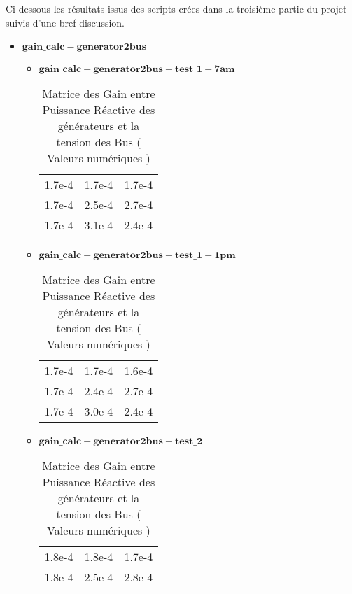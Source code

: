 Ci-dessous les résultats issus des scripts crées dans la troisième partie du projet suivis d'une bref discussion. 

\begin{itemize}
\item $\mathbf{gain\_calc-generator2bus}$\\
\begin{itemize}
	
\item $\mathbf{gain\_calc-generator2bus-test\_1-7am}$
\begin{table}[H]
	\captionsetup{justification=centering,margin=2cm}
	\caption{Matrice des Gain entre Puissance Réactive des générateurs et la tension des Bus ( Valeurs numériques )}
	\centering
	\begin{tabular}{ccc}
		1.7e-4&1.7e-4&1.7e-4\\
		1.7e-4&2.5e-4&2.7e-4\\
		1.7e-4&3.1e-4&2.4e-4\\
	\end{tabular}
\end{table}

\item $\mathbf{gain\_calc-generator2bus-test\_1-1pm}$
\begin{table}[H]
	\captionsetup{justification=centering,margin=2cm}
	\caption{Matrice des Gain entre Puissance Réactive des générateurs et la tension des Bus ( Valeurs numériques )}
	\centering
	\begin{tabular}{ccc}
		1.7e-4&1.7e-4&1.6e-4\\
		1.7e-4&2.4e-4&2.7e-4\\
		1.7e-4&3.0e-4&2.4e-4\\
	\end{tabular}
	
\end{table}
\newpage\vspace{2em}
\item $\mathbf{gain\_calc-generator2bus-test\_2}$
\begin{table}[H]
	\captionsetup{justification=centering,margin=2cm}
	\caption{Matrice des Gain entre Puissance Réactive des générateurs et la tension des Bus ( Valeurs numériques )}
	\centering
	\begin{tabular}{ccc}
		
		1.8e-4&1.8e-4&1.7e-4\\
		
		1.8e-4&2.5e-4&2.8e-4\\
		

\end{tabular}
\end{table}
\end{itemize}
\end{itemize}
